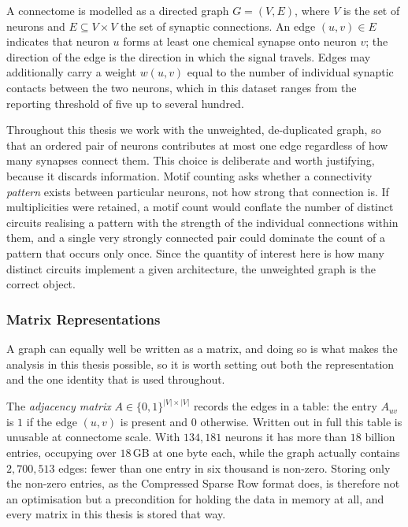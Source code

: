 \documentclass[12pt,a4paper,oneside]{article}
\theoremstyle{definition}
\theoremstyle{plain}
\begin{document}
A connectome is modelled as a directed graph $G = (V, E)$, where $V$ is the
set of neurons and $E \subseteq V \times V$ the set of synaptic connections.
An edge $(u,v) \in E$ indicates that neuron $u$ forms at least one chemical
synapse onto neuron $v$; the direction of the edge is the direction in which
the signal travels. Edges may additionally carry a weight $w(u,v)$ equal to
the number of individual synaptic contacts between the two neurons, which in
this dataset ranges from the reporting threshold of five up to several
hundred.

Throughout this thesis we work with the unweighted, de-duplicated graph, so
that an ordered pair of neurons contributes at most one edge regardless of
how many synapses connect them. This choice is deliberate and worth
justifying, because it discards information. Motif counting asks whether a
connectivity \emph{pattern} exists between particular neurons, not how
strong that connection is. If multiplicities were retained, a motif count
would conflate the number of distinct circuits realising a pattern with the
strength of the individual connections within them, and a single very
strongly connected pair could dominate the count of a pattern that occurs
only once. Since the quantity of interest here is how many distinct circuits
implement a given architecture, the unweighted graph is the correct object.

\subsubsection{Matrix Representations}

A graph can equally well be written as a matrix, and doing so is what makes
the analysis in this thesis possible, so it is worth setting out both the
representation and the one identity that is used throughout.

The \emph{adjacency matrix} $A \in \{0,1\}^{|V| \times |V|}$ records the
edges in a table: the entry $A_{uv}$ is $1$ if the edge $(u,v)$ is present
and $0$ otherwise. Written out in full this table is unusable at connectome
scale. With $134{,}181$ neurons it has more than $18$ billion entries,
occupying over $18$\,GB at one byte each, while the graph actually contains
$2{,}700{,}513$ edges: fewer than one entry in six thousand is non-zero.
Storing only the non-zero entries, as the Compressed Sparse Row format does,
is therefore not an optimisation but a precondition for holding the data in
memory at all, and every matrix in this thesis is stored that way.
\end{document}
